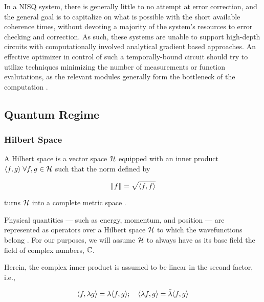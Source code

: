 In a NISQ system, there is generally little to no attempt at error correction,
and the general goal is to capitalize on what is possible with the short
available coherence times, without devoting a majority of the system's resources
to error checking and correction. As such, these systems are unable to support
high-depth circuits with computationally involved analytical gradient based
approaches. An effective optimizer in control of such a temporally-bound circuit
should try to utilize techniques minimizing the number of measurements or
function evalutations, as the relevant modules generally form the bottleneck of
the computation \cite[see][chapter II.D]{bharti2021noisy}.

\subsection{Quantum Regime}

\subsubsection{Hilbert Space}
\begin{definition}
    A Hilbert space is a vector space \(\mathcal{H}\) equipped with an inner
    product \(\langle f, g\rangle \;\forall f, g \in \mathcal{H}\) such that
    the norm defined by

    \begin{equation*}
        \norm{f} = \sqrt{\langle f, f\rangle}
    \end{equation*}

    turns \(\mathcal{H}\) into a complete metric space
    \cite{sansone1959orthogonal}.
\end{definition}

Physical quantities --- such as energy, momentum, and position --- are
represented as operators over a Hilbert space \(\mathcal{H}\) to which the
wavefunctions belong \cite{hall2013quantum}. 
For our purposes, we will assume \(\mathcal{H}\) to always
have as its base field the field of complex numbers, \(\mathbb{C}\).

Herein, the complex inner product is assumed to be linear in the second factor,
i.e.,

\begin{equation*}
    \langle f, \lambda g\rangle = \lambda \langle f, g\rangle; \quad \langle \lambda f, g\rangle = \bar{\lambda} \langle f, g\rangle
\end{equation*}

